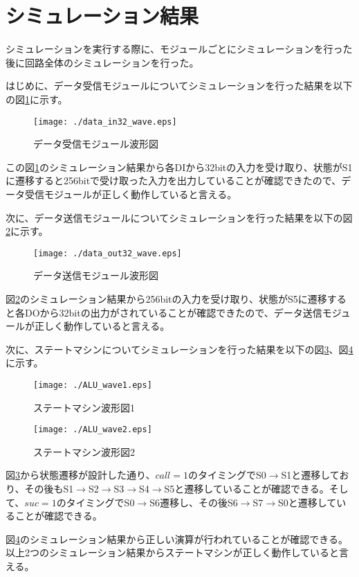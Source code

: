 \documentclass{thesis}
\begin{document}
\section{シミュレーション結果}
シミュレーションを実行する際に、モジュールごとにシミュレーションを行った後に回路全体のシミュレーションを行った。\par
はじめに、データ受信モジュールについてシミュレーションを行った結果を以下の図\ref{データ受信_sim}に示す。
\begin{figure}[H]
 \center
 \texttt{[image: ./data\_in32\_wave.eps]}
 \caption{データ受信モジュール波形図}
 \label{データ受信_sim}
\end{figure}
この図\ref{データ受信_sim}のシミュレーション結果から各DIから32bitの入力を受け取り、状態がS1に遷移すると256bitで受け取った入力を出力していることが確認できたので、データ受信モジュールが正しく動作していると言える。\par
次に、データ送信モジュールについてシミュレーションを行った結果を以下の図\ref{データ送信_sim}に示す。
\begin{figure}[H]
 \center
 \texttt{[image: ./data\_out32\_wave.eps]}
 \caption{データ送信モジュール波形図}
 \label{データ送信_sim}
\end{figure}
図\ref{データ送信_sim}のシミュレーション結果から256bitの入力を受け取り、状態がS5に遷移すると各DOから32bitの出力がされていることが確認できたので、データ送信モジュールが正しく動作していると言える。\par
次に、ステートマシンについてシミュレーションを行った結果を以下の図\ref{ALU_sim1}、図\ref{ALU_sim2}に示す。
\begin{figure}[H]
 \center
 \texttt{[image: ./ALU\_wave1.eps]}
 \caption{ステートマシン波形図1}
 \label{ALU_sim1}
\end{figure}
\begin{figure}[H]
 \center
 \texttt{[image: ./ALU\_wave2.eps]}
 \caption{ステートマシン波形図2}
 \label{ALU_sim2}
\end{figure}
図\ref{ALU_sim1}から状態遷移が設計した通り、$call = 1$のタイミングでS0$\rightarrow$S1と遷移しており、その後もS1$\rightarrow$S2$\rightarrow$S3$\rightarrow$S4$\rightarrow$S5と遷移していることが確認できる。そして、$suc = 1$のタイミングでS0$\rightarrow$S6遷移し、その後S6$\rightarrow$S7$\rightarrow$S0と遷移していることが確認できる。\par
図\ref{ALU_sim2}のシミュレーション結果から正しい演算が行われていることが確認できる。
以上2つのシミュレーション結果からステートマシンが正しく動作していると言える。\par
\end{document}
